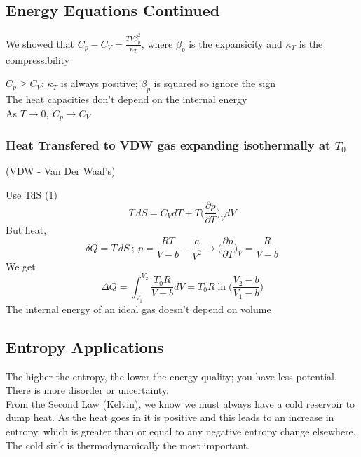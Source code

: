 \documentclass[a4paper, 11pt, normalem]{report}
\newcommand\p{\partial}
\begin{document}
\chapter{}
\section{Energy Equations Continued}
We showed that $C_p - C_V = \frac{TV\beta_{p}^2}{\kappa_T}$, where $\beta_p$ is the expansicity and $\kappa_T$ is the compressibility

$C_p \geq C_V$: $\kappa_T$ is always positive; $\beta_p$ is squared so ignore the sign \\
The heat capacities don't depend on the internal energy \\
As $T \to 0,~ C_p \to C_V$

\subsection{Heat Transfered to VDW gas expanding isothermally at $T_0$}
(VDW - Van Der Waal's)

Use TdS (1)
\begin{equation*}
    T\,dS = C_V dT + T\Big(\frac{\p p}{\p T}\Big)_V dV
\end{equation*}
But heat,
\begin{equation*}
    \delta Q = T\,dS ~;~ p = \frac{RT}{V - b} - \frac{a}{V^2} \to \Big(\frac{\p p}{\p T}\Big)_V = \frac{R}{V - b}
\end{equation*}
We get
\begin{equation*}
    \Delta Q = \int_{V_1}^{V_2} \frac{T_0 R}{V - b}dV = T_0 R\ln\Big(\frac{V_2 - b}{V_1 - b}\Big)
\end{equation*}
The internal energy of an ideal gas doesn't depend on volume

\section{Entropy Applications}
The higher the entropy, the lower the energy quality; you have less potential.
There is more disorder or uncertainty. \\
From the Second Law (Kelvin), we know we must always have a cold reservoir to dump heat.
As the heat goes in it is positive and this leads to an increase in entropy, which is greater than or equal to any negative entropy change elsewhere. \\
The cold sink is thermodynamically the most important.
\end{document}
